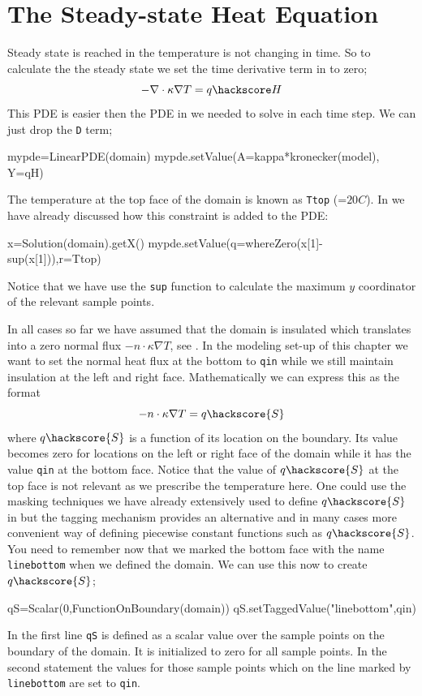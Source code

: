 \section{The Steady-state Heat Equation}

Steady state is reached in the temperature is not changing in time. So to calculate the 
the steady state we set the time derivative term in  to zero;
\begin{equation}\label{eqn:Tform nabla steady}
-\nabla \cdot \kappa \nabla T = q\hackscore H
\end{equation}
This PDE is easier then the PDE in  we needed to solve in each time step. We can just drop
the \verb|D| term;
\begin{python}
mypde=LinearPDE(domain)
mypde.setValue(A=kappa*kronecker(model), Y=qH)
\end{python}
The temperature at the top face of the domain is known as \verb|Ttop| (=$20 C$). In  we have 
already discussed how this constraint is added to the PDE:
\begin{python}
x=Solution(domain).getX()
mypde.setValue(q=whereZero(x[1]-sup(x[1])),r=Ttop)
\end{python}
Notice that we have use the \verb|sup| function to calculate the maximum $y$ coordinator of the relevant sample points.

In all cases so far we have assumed that the domain is insulated which translates 
into a zero normal flux $-n \cdot \kappa \nabla T$, see . In the modeling
set-up of this chapter we want to set the normal heat flux at the bottom to \verb|qin| while we still
maintain insulation at the left and right face. Mathematically we can express this as the format
\begin{equation}
-n \cdot \kappa \nabla T = q\hackscore{S}
\label{eq:inhom flux}
\end{equation}
where $q\hackscore{S}$ is a function of its location on the boundary. Its value becomes zero
for locations on the left or right face of the domain while it has the value \verb|qin| at the bottom face.
Notice that the value of $q\hackscore{S}$ at the top face is not relevant as we prescribe the temperature here.
One could use the masking techniques we have already extensively used to define $q\hackscore{S}$ in \esc
but the tagging mechanism provides an alternative and in many cases more convenient way of defining piecewise 
constant functions such as $q\hackscore{S}$. You need to remember now that we
marked the bottom face with the name \verb|linebottom| when we defined the domain. 
We can use this now to create $q\hackscore{S}$;
\begin{python}
qS=Scalar(0,FunctionOnBoundary(domain))
qS.setTaggedValue("linebottom",qin)
\end{python}
In the first line \verb|qS| is defined as a scalar value over the sample points on the boundary of the domain. It is
initialized to zero for all sample points. In the second statement the values for those sample points which
on the line marked by \verb|linebottom| are set to \verb|qin|. 

